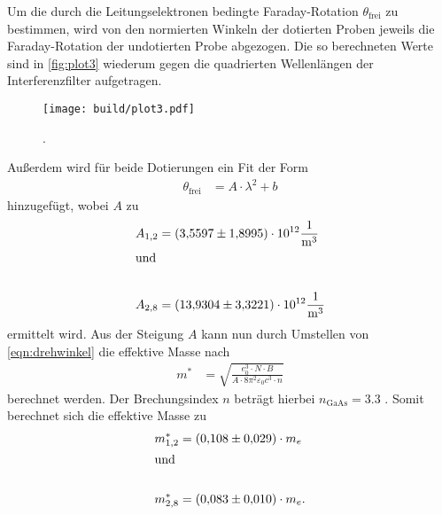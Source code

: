 Um die durch die Leitungselektronen bedingte Faraday-Rotation $\theta_{\text{frei}}$ zu bestimmen, wird von den normierten Winkeln der dotierten Proben jeweils
die Faraday-Rotation der undotierten Probe abgezogen.
Die so berechneten Werte sind in \autoref{fig:plot3}
wiederum gegen die quadrierten Wellenlängen der Interferenzfilter aufgetragen.
\begin{figure}[H]
  \centering
  \texttt{[image: build/plot3.pdf]}
  \caption {.}
  \label{fig:plot3}
\end{figure}
Außerdem wird für beide Dotierungen ein Fit der Form
\begin{align*}
  \theta_{\text{frei}} &= A \cdot \lambda^2+b
\end{align*}
hinzugefügt, wobei $A$ zu
\begin{align*}
  A_{1,2}&= \num{3.5597 \pm 1.8995 e12}\si{\per\cubic\metre}\\
  \shortintertext{und}\\
  A_{2,8}&= \num{13.9304 \pm 3.3221e12}\si{\per\cubic\metre}
\end{align*}
ermittelt wird.
Aus der Steigung $A$ kann nun durch Umstellen von \autoref{eqn:drehwinkel} die effektive Masse nach
\begin{align*}
  m^* &= \sqrt{\frac{e_0^3\cdot N \cdot B}{A\cdot 8\pi^2\varepsilon_0 c^3 \cdot n }} 
\end{align*}
berechnet werden.
Der Brechungsindex $n$ beträgt hierbei $n_{\text{GaAs}}=\num{3.3}$ \cite{BrechungsindexGaAs}.
Somit berechnet sich die effektive Masse zu
\begin{align*}
  m^*_{1,2}&=(\num{0.108 \pm 0.029}) \cdot m_e \\
  \shortintertext{und}\\
  m^*_{2,8}&=(\num{0.083 \pm 0.010})\cdot m_e.
\end{align*}
